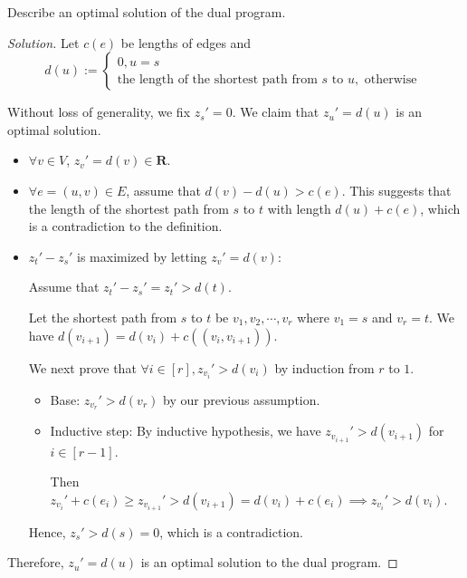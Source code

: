 

\begin{thm}{}{}
    Describe an optimal solution of the dual program.
\end{thm}

\begin{proof}[Solution]
    Let $c(e)$ be lengths of edges and 
    $$d(u) := \begin{cases}
        0, u = s \\
        \text{the length of the shortest path from } s \text{ to } u, \text{ otherwise }
    \end{cases}$$

    Without loss of generality, we fix $z_s' = 0$. We claim that $z_u' = d(u)$ is an optimal solution. 
    \begin{itemize}
        \item $\forall v \in V$, $z_v' = d(v) \in \mathbf R $.
        \item $\forall e = (u, v) \in E$, assume that $d(v) - d(u) > c(e)$. This suggests that the length of the shortest path from $s$ to $t$ with length $d(u) + c(e)$, which is a contradiction to the definition.
        \item $z_t' - z_s'$ is maximized by letting $z_v' = d(v)$:
        
            Assume that $z_t' - z_s' = z_t' > d(t)$.

            Let the shortest path from $s$ to $t$ be $v_1, v_2, \cdots , v_r$ where $v_1 = s$ and $v_r = t$. We have $d(v_{i+1}) = d(v_i) + c((v_i, v_{i+1}))$.

            We next prove that $\forall i \in [r], z_{v_i}' > d({v_i})$ by induction from $r$ to $1$.
            \begin{itemize}
                \item Base: $z_{v_r}' > d(v_r)$ by our previous assumption.
                \item Inductive step: By inductive hypothesis, we have $z_{v_{i+1}}' > d(v_{i+1})$ for $i \in [r - 1]$.

                    Then $z_{v_i}' + c(e_i) \ge z_{v_{i+1}}' > d(v_{i+1}) = d(v_i) + c(e_i) \implies z_{v_i}' > d(v_i)$.
            \end{itemize}

            Hence, $z_s' > d(s) = 0$, which is a contradiction.
    \end{itemize}

    Therefore, $z_u' = d(u)$ is an optimal solution to the dual program.
\end{proof}

